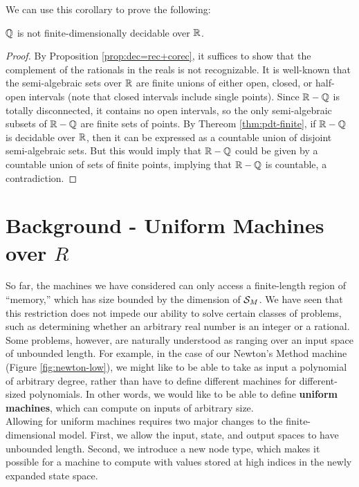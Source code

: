   We can use this corollary to prove the following:

  \begin{theorem}
    $\mathbb{Q}$ is not finite-dimensionally decidable over $\mathbb{R}$.
  \end{theorem}
  
  \begin{proof}
    By Proposition \ref{prop:dec=rec+corec}, it suffices to show that
    the complement of the rationals in the reals is not recognizable.
    It is well-known that the semi-algebraic sets over $\mathbb{R}$ are
    finite unions of either open, closed, or half-open intervals (note
    that closed intervals include single points).  Since $\mathbb{R} -
    \mathbb{Q}$ is totally disconnected, it contains no open
    intervals, so the only semi-algebraic subsets of
    $\mathbb{R}-\mathbb{Q}$ are finite sets of points. By Thereom
    \ref{thm:pdt-finite}, if $\mathbb{R}-\mathbb{Q}$ is decidable over
    $\mathbb{R}$, then it can be expressed as a countable union of
    disjoint semi-algebraic sets.  But this would imply that
    $\mathbb{R}-\mathbb{Q}$ could be given by a countable union of sets of
    finite points, implying that $\mathbb{R}-\mathbb{Q}$ is countable, a
    contradiction.
  \end{proof}
    
\chapter{Background - Uniform Machines over $R$}

  So far, the machines we have considered can only access a
  finite-length region of ``memory,'' which has size bounded by the
  dimension of $\mathcal{S}_M$.  We have seen that this restriction
  does not impede our ability to solve certain classes of problems,
  such as determining whether an arbitrary real number is an integer
  or a rational.  Some problems, however, are naturally understood as
  ranging over an input space of unbounded length.  For example, in
  the case of our Newton's Method machine (Figure
  \ref{fig:newton-low}), we might like to be able to take as input a
  polynomial of arbitrary degree, rather than have to define different
  machines for different-sized polynomials.  In other words, we would
  like to be able to define \textbf{uniform machines}, which can
  compute on inputs of arbitrary size.\\

  Allowing for uniform machines requires two major changes to the
  finite-dimensional model.  First, we allow the input, state, and
  output spaces to have unbounded length.  Second, we introduce a new
  node type, which makes it possible for a machine to compute with
  values stored at high indices in the newly expanded state space.\\
  
